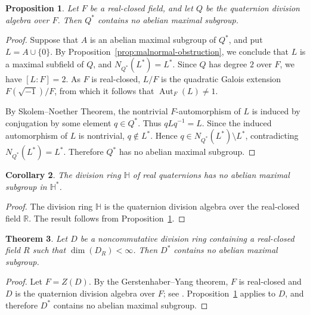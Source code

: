 \documentclass[11pt]{amsart}
\newtheorem{theorem}{Theorem}[section]
\newtheorem{proposition}[theorem]{Proposition}
\newtheorem{corollary}[theorem]{Corollary}
\theoremstyle{definition}
\begin{document}
\begin{proposition}
\label{prop:real-closed-quaternion}
Let $F$ be a real-closed field, and let $Q$ be the quaternion division algebra
over $F$. Then $Q^*$ contains no abelian maximal subgroup.
\end{proposition}

\begin{proof}
Suppose that $A$ is an abelian maximal subgroup of $Q^*$, and put
$L=A\cup\{0\}$. By Proposition~\ref{prop:malnormal-obstruction}, we conclude that $L$ is a maximal subfield of $Q$, and $N_{Q^*}(L^*)=L^*$. Since $Q$ has degree $2$ over $F$, we have $[L:F]=2$. As $F$ is real-closed,
$L/F$ is the quadratic Galois extension $F(\sqrt{-1})/F$, from which it follows that  $\operatorname{Aut}_F(L)\ne 1$.

By Skolem--Noether Theorem, the nontrivial $F$-automorphism of $L$ is induced by
conjugation by some element $q\in Q^*$. Thus $qLq^{-1}=L$. Since the induced
automorphism of $L$ is nontrivial, $q\notin L^*$. Hence
$q\in N_{Q^*}(L^*)\setminus L^*$, contradicting $N_{Q^*}(L^*)=L^*$.
Therefore $Q^*$ has no abelian maximal subgroup.
\end{proof}

\begin{corollary}
\label{cor:H-no-abelian-maximal}
The division ring $\mathbb H$ of real quaternions has no abelian maximal subgroup in $\mathbb H^*$.
\end{corollary}

\begin{proof}
The division ring $\mathbb H$ is the quaternion division algebra over the
real-closed field $\mathbb R$. The result follows from
Proposition~\ref{prop:real-closed-quaternion}.
\end{proof}

\begin{theorem}
\label{thm:real-closed-subfield-no-abelian-maximal}
Let $D$ be a noncommutative division ring containing a real-closed field $R$
such that $\dim(D_R)<\infty$. Then $D^*$ contains no abelian maximal subgroup.
\end{theorem}

\begin{proof}
Let $F=Z(D)$. By the Gerstenhaber--Yang theorem, $F$ is real-closed and $D$
is the quaternion division algebra over $F$; see \cite[(15.10)]{L}.
Proposition~\ref{prop:real-closed-quaternion} applies to $D$, and therefore
$D^*$ contains no abelian maximal subgroup.
\end{proof}
\end{document}
